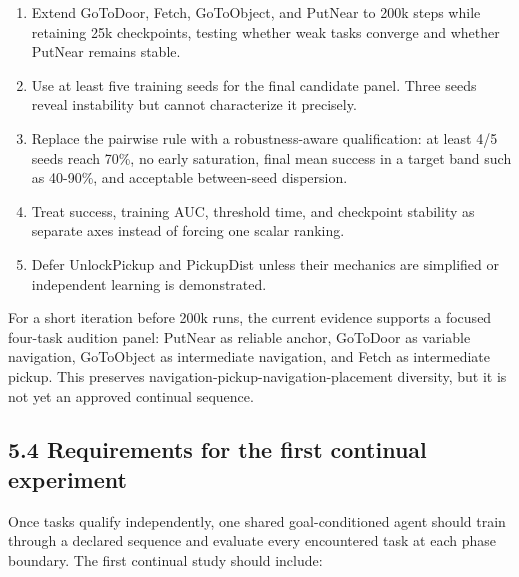 \documentclass[10pt,a4paper]{article}
\newcommand{\reportsubsection}[1]{\subsection{\textcolor{brandblue}{#1}}}
\begin{document}
\begin{enumerate}
\item Extend GoToDoor, Fetch, GoToObject, and PutNear to 200k steps while retaining 25k checkpoints, testing whether weak tasks converge and whether PutNear remains stable.
\item Use at least five training seeds for the final candidate panel. Three seeds reveal instability but cannot characterize it precisely.
\item Replace the pairwise rule with a robustness-aware qualification: at least 4/5 seeds reach 70\%, no early saturation, final mean success in a target band such as 40-90\%, and acceptable between-seed dispersion.
\item Treat success, training AUC, threshold time, and checkpoint stability as separate axes instead of forcing one scalar ranking.
\item Defer UnlockPickup and PickupDist unless their mechanics are simplified or independent learning is demonstrated.
\end{enumerate}
For a short iteration before 200k runs, the current evidence supports a focused four-task audition panel: PutNear as reliable anchor, GoToDoor as variable navigation, GoToObject as intermediate navigation, and Fetch as intermediate pickup. This preserves navigation-pickup-navigation-placement diversity, but it is not yet an approved continual sequence.

\reportsubsection{5.4 Requirements for the first continual experiment}
Once tasks qualify independently, one shared goal-conditioned agent should train through a declared sequence and evaluate every encountered task at each phase boundary. The first continual study should include:
\end{document}

